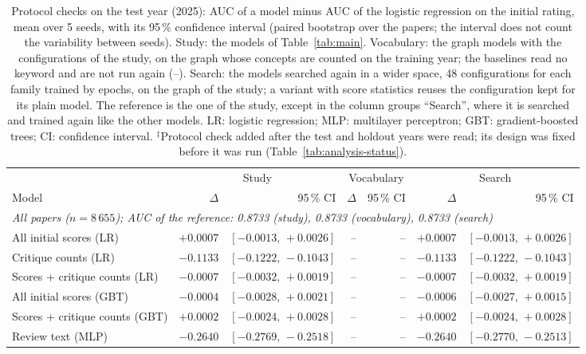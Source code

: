 \begin{table}[t]
\centering
\footnotesize
\setlength{\tabcolsep}{1.2pt}
\caption{Protocol checks on the test year (2025): AUC of a model minus AUC of the logistic regression on the initial rating, mean over 5 seeds, with its 95\,\% confidence interval (paired bootstrap over the papers; the interval does not count the variability between seeds). Study: the models of Table~\ref{tab:main}. Vocabulary: the graph models with the configurations of the study, on the graph whose concepts are counted on the training year; the baselines read no keyword and are not run again (--). Search: the models searched again in a wider space, 48 configurations for each family trained by epochs, on the graph of the study; a variant with score statistics reuses the configuration kept for its plain model. The reference is the one of the study, except in the column groups ``Search'', where it is searched and trained again like the other models. LR: logistic regression; MLP: multilayer perceptron; GBT: gradient-boosted trees; CI: confidence interval. $^{\ddagger}$Protocol check added after the test and holdout years were read; its design was fixed before it was run (Table~\ref{tab:analysis-status}).}
\label{tab:protocol-test}
\begin{tabular}{@{}lrrrrrr@{}}
\toprule
 & \multicolumn{2}{c}{Study} & \multicolumn{2}{c}{Vocabulary} & \multicolumn{2}{c}{Search} \\
\cmidrule(lr){2-3} \cmidrule(lr){4-5} \cmidrule(lr){6-7}
Model & $\Delta$ & 95\,\% CI & $\Delta$ & 95\,\% CI & $\Delta$ & 95\,\% CI \\
\midrule
\multicolumn{7}{l}{\emph{All papers ($n = 8\,655$); AUC of the reference: 0.8733 (study), 0.8733 (vocabulary), 0.8733 (search)}} \\
All initial scores (LR) & $+0.0007$ & $[-0.0013,\,+0.0026]$ & -- & -- & $+0.0007$ & $[-0.0013,\,+0.0026]$ \\
Critique counts (LR) & $-0.1133$ & $[-0.1222,\,-0.1043]$ & -- & -- & $-0.1133$ & $[-0.1222,\,-0.1043]$ \\
Scores + critique counts (LR) & $-0.0007$ & $[-0.0032,\,+0.0019]$ & -- & -- & $-0.0007$ & $[-0.0032,\,+0.0019]$ \\
All initial scores (GBT) & $-0.0004$ & $[-0.0028,\,+0.0021]$ & -- & -- & $-0.0006$ & $[-0.0027,\,+0.0015]$ \\
Scores + critique counts (GBT) & $+0.0002$ & $[-0.0024,\,+0.0028]$ & -- & -- & $+0.0002$ & $[-0.0024,\,+0.0028]$ \\
Review text (MLP) & $-0.2640$ & $[-0.2769,\,-0.2518]$ & -- & -- & $-0.2640$ & $[-0.2770,\,-0.2513]$ \\

\end{tabular}
\end{table}
